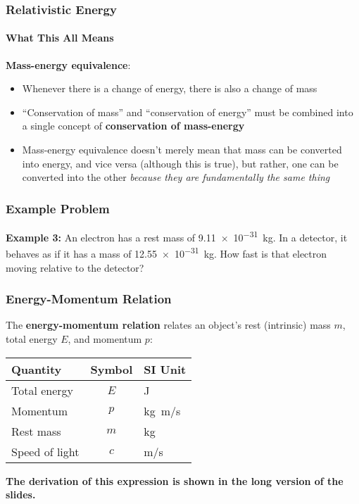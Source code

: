 \documentclass[12pt,compress,aspectratio=169]{beamer}
\newcommand{\eq}[2]{\vspace{#1}{\Large\begin{displaymath}#2\end{displaymath}}}
\begin{document}
\begin{frame}
  \frametitle{Relativistic Energy}
  \framesubtitle{What This All Means}
  
  \eq{-.2in}{
    \boxed{E=mc^2}
  }

  \textbf{Mass-energy equivalence}:
  \begin{itemize}
  \item Whenever there is a change of energy, there is also a change of mass
  \item ``Conservation of mass'' and ``conservation of energy'' must be
    combined into a single concept of \textbf{conservation of mass-energy}
  \item Mass-energy equivalence doesn't merely mean that mass can be converted
    into energy, and vice versa (although this is true), but rather, one can be
    converted into the other
    \emph{because they are fundamentally the same thing}
  \end{itemize}
\end{frame}



\begin{frame}
  \frametitle{Example Problem}
  \textbf{Example 3:} An electron has a rest mass of \SI{9.11e-31}{\kilo\gram}.
  In a detector, it behaves as if it has a mass of \SI{12.55e-31}{\kilo\gram}.
  How fast is that electron moving relative to the detector?
\end{frame}


\begin{frame}
  \frametitle{Energy-Momentum Relation}
  The \textbf{energy-momentum relation} relates an object's rest (intrinsic)
  mass $m$, total energy $E$, and momentum $p$:

  \eq{-.2in}{
    \boxed{E^2=p^2c^2+m^2c^4}
  }
  \begin{center}
    \begin{tabular}{l|c|l}
      \rowcolor{pink}
      \textbf{Quantity} & \textbf{Symbol} & \textbf{SI Unit} \\ \hline
      Total energy   & $E$ & \si{\joule}\\
      Momentum       & $p$ & \si{\kilo\gram\metre/\second}\\
      Rest mass      & $m$ & \si{\kilo\gram}\\
      Speed of light & $c$ & \si{\metre/\second}
    \end{tabular}
  \end{center}

  \textbf{The derivation of this expression is shown in the long version of the
  slides.}
\end{frame}
\end{document}
